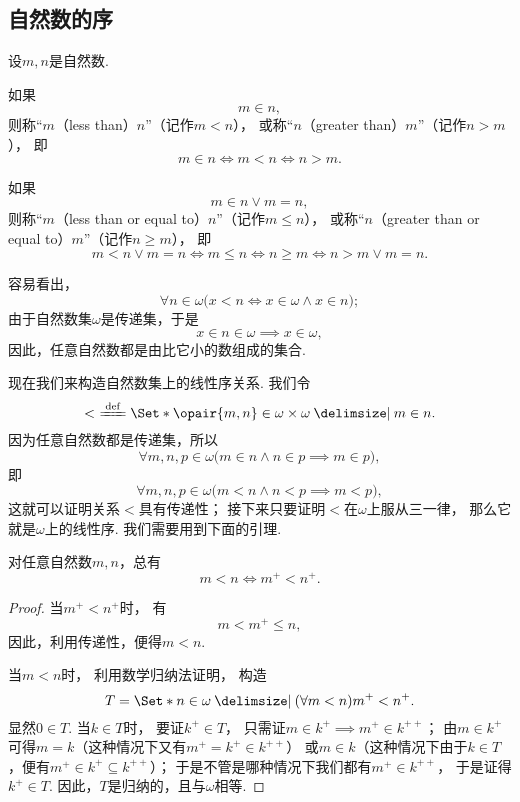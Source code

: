\subsection{自然数的序}
\begin{definition}
设\(m,n\)是自然数.

如果\[
	m \in n,
\]
则称“\(m\)（less than）\(n\)”（记作\(m < n\)），
或称“\(n\)（greater than）\(m\)”（记作\(n > m\)），
即\[
	m \in n
	\iff m < n
	\iff n > m.
\]

如果\[
	m \in n \lor m = n,
\]
则称“\(m\)（less than or equal to）\(n\)”（记作\(m \leqslant n\)），
或称“\(n\)（greater than or equal to）\(m\)”（记作\(n \geqslant m\)），
即\[
	m < n \lor m = n
	\iff m \leqslant n
	\iff n \geqslant m
	\iff n > m \lor m = n.
\]
\end{definition}

容易看出，\[
	\forall n\in\omega \bigl(
		x < n
		\iff
		x \in \omega \land x \in n
	\bigr);
\]
由于自然数集\(\omega\)是传递集，于是\[
	x \in n \in \omega \implies x \in \omega,
\]
因此，任意自然数都是由比它小的数组成的集合.

现在我们来构造自然数集上的线性序关系.
我们令\[
	<\ \defeq \Set*{
		\opair{m,n} \in \omega \times \omega
		\given
		m \in n
	}.
\]
因为任意自然数都是传递集，所以\[
	\forall m,n,p \in \omega \bigl(
		m \in n \land n \in p
		\implies
		m \in p
	\bigr),
\]
即\[
	\forall m,n,p \in \omega \bigl(
		m < n \land n < p
		\implies
		m < p
	\bigr),
\]
这就可以证明关系\(<\)具有传递性；
接下来只要证明\(<\)在\(\omega\)上服从三一律，
那么它就是\(\omega\)上的线性序.
我们需要用到下面的引理.

\begin{lemma}\label{theorem:集合论.自然数的线性序.引理1}
对任意自然数\(m,n\)，总有\[
	m < n
	\iff
	m^+ < n^+.
\]
\begin{proof}
当\(m^+ < n^+\)时，
有\[
	m < m^+ \leqslant n,
\]
因此，利用传递性，便得\(m < n\).

当\(m < n\)时，
利用数学归纳法证明，
构造\[
	T = \Set*{
		n \in \omega
		\given
		(\forall m < n)
		m^+ < n^+
	}.
\]
显然\(0 \in T\).
当\(k \in T\)时，
要证\(k^+ \in T\)，
只需证\(m \in k^+ \implies m^+ \in k^{++}\)；
由\(m \in k^+\)可得\(m = k\)（这种情况下又有\(m^+ = k^+ \in k^{++}\)）
或\(m \in k\)（这种情况下由于\(k \in T\)，便有\(m^+ \in k^+ \subseteq k^{++}\)）；
于是不管是哪种情况下我们都有\(m^+ \in k^{++}\)，
于是证得\(k^+ \in T\).
因此，\(T\)是归纳的，且与\(\omega\)相等.
\end{proof}
\end{lemma}

